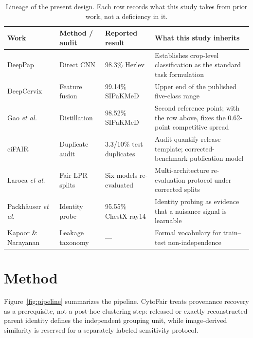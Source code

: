 \documentclass[conference]{IEEEtran}
\newcommand{\cytofair}{CytoFair}
\begin{document}
\begin{table}[t]
\caption{Lineage of the present design. Each row records what this study takes from prior work, not a deficiency in it.}
\label{tab:prior}
\centering
\scriptsize
\setlength{\tabcolsep}{8pt}
\begin{tabular}{p{}p{}p{}p{}}
\toprule
Work & Method / audit & Reported result & What this study inherits \\
\midrule
DeepPap~\cite{zhang2017deeppap} & Direct CNN & 98.3\% Herlev & Establishes crop-level classification as the standard task formulation \\
DeepCervix~\cite{rahaman2021deepcervix} & Feature fusion & 99.14\% SIPaKMeD & Upper end of the published five-class range \\
Gao \emph{et al.}~\cite{gao2022knowledge} & Distillation & 98.52\% SIPaKMeD & Second reference point; with the row above, fixes the 0.62-point competitive spread \\
ciFAIR~\cite{barz2020cifair} & Duplicate audit & 3.3/10\% test duplicates & Audit-quantify-release template; corrected-benchmark publication model \\
Laroca \emph{et al.}~\cite{laroca2023lpr} & Fair LPR splits & Six models re-evaluated & Multi-architecture re-evaluation protocol under corrected splits \\
Packh\"auser \emph{et al.}~\cite{packhauser2022reidentification} & Identity probe & 95.55\% ChestX-ray14 & Identity probing as evidence that a nuisance signal is learnable \\
Kapoor \& Narayanan~\cite{kapoor2023leakage} & Leakage taxonomy & --- & Formal vocabulary for train--test non-independence \\
\bottomrule
\end{tabular}
\end{table}

\section{Method}
Figure~\ref{fig:pipeline} summarizes the pipeline.
\cytofair{} treats provenance recovery as a prerequisite, not a post-hoc clustering step: released or exactly reconstructed parent identity defines the independent grouping unit, while image-derived similarity is reserved for a separately labeled sensitivity protocol.
\end{document}
